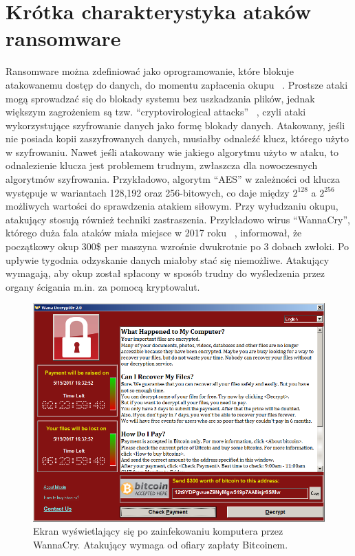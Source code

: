 \section{Krótka charakterystyka ataków ransomware}
Ransomware można zdefiniować jako oprogramowanie, które blokuje atakowanemu dostęp do danych, do momentu zapłacenia okupu ~\cite{ransomware_us}. Prostsze ataki mogą sprowadzać się do blokady systemu bez uszkadzania plików, jednak większym zagrożeniem są tzw. \foreignquote{english}{cryptovirological attacks} ~\cite{502676}, czyli ataki wykorzystujące szyfrowanie danych jako formę blokady danych. Atakowany, jeśli nie posiada kopii zaszyfrowanych danych, musiałby odnaleźć klucz, którego użyto w szyfrowaniu. Nawet jeśli atakowany wie jakiego algorytmu użyto w ataku, to odnalezienie klucza jest problemem trudnym, zwłaszcza dla nowoczesnych algorytmów szyfrowania. Przykładowo, algorytm \foreignquote{english}{AES} w zależności od klucza występuje w wariantach 128,192 oraz 256-bitowych, co daje między $2^{128}$ a $2^{256}$ możliwych wartości do sprawdzenia atakiem siłowym. 
\newline
Przy wyłudzaniu okupu, atakujący stosują również techniki zastraszenia. Przykładowo wirus \foreignquote{english}{WannaCry}, którego duża fala ataków miała miejsce w 2017 roku ~\cite{czarnecki_oto_2017}, informował, że początkowy okup 300\$ per maszyna wzrośnie dwukrotnie po 3 dobach zwłoki. Po upływie tygodnia odzyskanie danych miałoby stać się niemożliwe. Atakujący wymagają, aby okup został spłacony w sposób trudny do wyśledzenia przez organy ścigania m.in. za pomocą kryptowalut.
\begin{figure}[H]
    \centering
    \includegraphics[width=0.95\linewidth]{rysunki/wannacry.png}
    \caption{Ekran wyświetlający się po zainfekowaniu komputera przez WannaCry. Atakujący wymaga od ofiary zapłaty Bitcoinem.}
    \label{fig:enter-label}
\end{figure}

